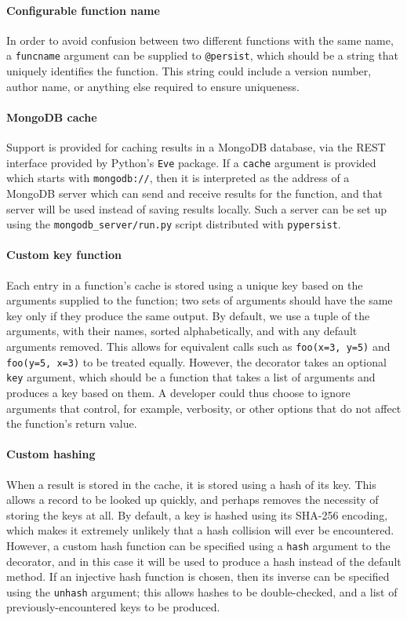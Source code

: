 \documentclass{deliverablereport}
\newcommand{\pypersist}{\texttt{pypersist}}
\begin{document}
\paragraph{Configurable function name}
In order to avoid confusion between two different functions with the same name,
a \texttt{funcname} argument can be supplied to \texttt{@persist}, which should
be a string that uniquely identifies the function.  This string could include a
version number, author name, or anything else required to ensure uniqueness.

\paragraph{MongoDB cache}
Support is provided for caching results in a MongoDB database, via the REST
interface provided by Python's \texttt{Eve} package.  If a \texttt{cache}
argument is provided which starts with \texttt{mongodb://}, then it is
interpreted as the address of a MongoDB server which can send and receive
results for the function, and that server will be used instead of saving results
locally.  Such a server can be set up using the \texttt{mongodb\_server/run.py}
script distributed with \pypersist{}.

\paragraph{Custom key function}
Each entry in a function's cache is stored using a unique key based on the
arguments supplied to the function; two sets of arguments should have the same
key only if they produce the same output.  By default, we use a tuple of the
arguments, with their names, sorted alphabetically, and with any default
arguments removed.  This allows for equivalent calls such as \texttt{foo(x=3,
  y=5)} and \texttt{foo(y=5, x=3)} to be treated equally.  However, the
decorator takes an optional \texttt{key} argument, which should be a function
that takes a list of arguments and produces a key based on them.  A developer
could thus choose to ignore arguments that control, for example, verbosity, or
other options that do not affect the function's return value.

\paragraph{Custom hashing}
When a result is stored in the cache, it is stored using a hash of its key.
This allows a record to be looked up quickly, and perhaps removes the necessity
of storing the keys at all.  By default, a key is hashed using its SHA-256
encoding, which makes it extremely unlikely that a hash collision will ever be
encountered.  However, a custom hash function can be specified using a
\texttt{hash} argument to the decorator, and in this case it will be used to
produce a hash instead of the default method.  If an injective hash function is
chosen, then its inverse can be specified using the \texttt{unhash} argument;
this allows hashes to be double-checked, and a list of previously-encountered
keys to be produced.
\end{document}
